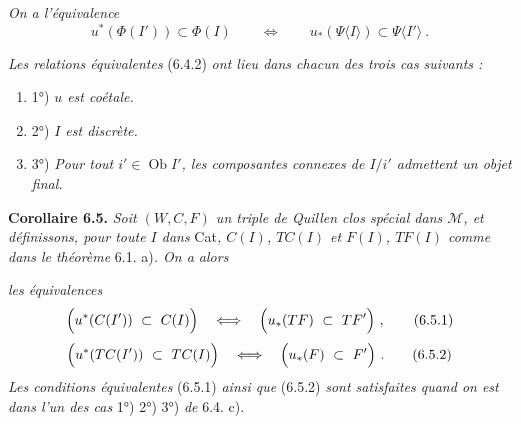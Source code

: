  \textit{On a l'équivalence}
\[
u^*(\Phi(I')) \subset \Phi(I) \qquad\Longleftrightarrow\qquad u_*(\Psi\langle I\rangle) \subset \Psi\langle I'\rangle\ .
\tag*{(6.4.2)}
\]

 \textit{Les relations équivalentes} (6.4.2) \textit{ont lieu dans chacun des trois cas suivants :}
\begin{enumerate}[label={}, leftmargin=2.5em]
\item 1°) \textit{$u$ est coétale.}
\item 2°) \textit{$I$ est discrète.}
\item 3°) \textit{Pour tout $i' \in \operatorname{Ob} I'$, les composantes connexes de $I/i'$ admettent un objet final.}
\end{enumerate}

\newpage
{}

\textbf{Corollaire 6.5.} \textit{Soit $(W,C,F)$ un triple de Quillen clos spécial dans $\mathcal{M}$, et définissons, pour toute $I$ dans} Cat\textit{, $C(I)$, $TC(I)$ et $F(I)$, $TF(I)$ comme dans le théorème} 6.1. a)\textit{. On a alors}


\textit{les équivalences}
\[
\Bigl(u^*(C(I'))\ \subset\ C(I)\Bigr) \quad\Longleftrightarrow\quad \Bigl(u_*(TF)\ \subset\ TF'\Bigr)\ ,
\tag*{(6.5.1)}
\]
\[
\Bigl(u^*(TC(I'))\ \subset\ TC(I)\Bigr) \quad\Longleftrightarrow\quad \Bigl(u_*(F)\ \subset\ F'\Bigr)\ .
\tag*{(6.5.2)}
\]
\textit{Les conditions équivalentes} (6.5.1) \textit{ainsi que} (6.5.2) \textit{sont satisfaites quand on est dans l'un des cas} 1°) 2°) 3°) \textit{de} 6.4. c).

